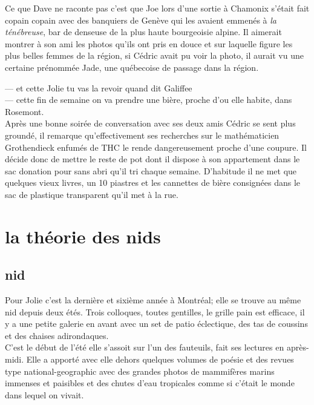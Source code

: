\documentclass{article}
\begin{document}
Ce que Dave ne raconte pas c'est que Joe lors d'une sortie à Chamonix s'était
fait copain copain avec des banquiers de Genève qui les avaient emmenés à
\textit{la ténébreuse}, bar de denseuse de la plus haute bourgeoisie alpine. Il
aimerait montrer à son ami les photos qu'ils ont pris en douce et sur laquelle
figure les plus belles femmes de la région, si Cédric avait pu voir la photo, il aurait
vu une certaine prénommée Jade, une québecoise de passage dans la région.

--- et cette Jolie tu vas la revoir quand dit Galiffee\\
--- cette fin de semaine on va prendre une bière, proche d'ou elle habite, dans Rosemont.\\

Après une bonne soirée de conversation avec ses deux amis Cédric se sent plus
groundé, il remarque qu'effectivement ses recherches sur le mathématicien
Grothendieck enfumés de THC le rende dangereusement proche d'une coupure. Il
décide donc de mettre le reste de pot dont il dispose à son appartement dans le
sac donation pour sans abri qu'il tri chaque semaine. D'habitude il ne met que
quelques vieux livres, un 10 piastres et les cannettes de bière consignées dans
le sac de plastique transparent qu'il met à la rue.



\clearpage


\section{la théorie des nids}

\subsection{nid}

Pour Jolie c’est la dernière et sixième année à Montréal; elle se
trouve au même nid depuis deux étés. Trois colloques, toutes
gentilles, le grille pain est efficace, il y a une petite galerie en
avant avec un set de patio éclectique, des tas de coussins et des
chaises adirondaques. \\

C’est le début de l’été elle s’assoit sur l’un
des fauteuils, fait ses lectures en après-midi. Elle a apporté avec
elle dehors quelques volumes de poésie et des revues type
national-geographic avec des grandes photos de mammifères marins
immenses et paisibles et des chutes d’eau tropicales comme si c’était
le monde dans lequel on vivait. \\
\end{document}
